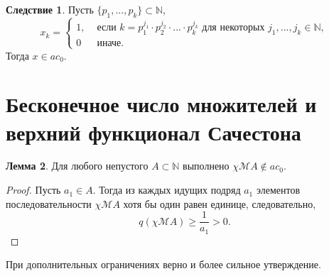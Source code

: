 \documentclass[a4paper,openbib]{article}
\theoremstyle{definition}
\newtheorem{lemma}{Лемма}[section]
\newtheorem{corollary}[lemma]{Следствие}
\begin{document}
\begin{corollary}
	\label{cor:ac0_powers_finite_set_of_numbers}
	Пусть $\{p_1, ..., p_k\} \subset \mathbb{N}$,
	\begin{equation}
		x_k = \begin{cases}
			1, &\mbox{~если~} k = p_1^{j_1}\cdot p_2^{j_2}\cdot ... \cdot p_k^{j_k} \mbox{~для некоторых~} j_1,...,j_k\in\mathbb{N},
			\\
			0  &\mbox{~иначе}.
		\end{cases}
	\end{equation}
	Тогда $x\in ac_0$.
\end{corollary}




\section{Бесконечное число множителей и \\  верхний функционал Сачестона}




\begin{lemma}
	Для любого непустого $A\subset \mathbb{N} $ выполнено $\chi\mathscr{M}A \notin ac_0$.
\end{lemma}
\begin{proof}
	Пусть $a_1\in A$.
	Тогда из каждых идущих подряд $a_1$ элементов последовательности $\chi\mathscr{M}A$
	хотя бы один равен единице,
	следовательно,
	\begin{equation}
		q(\chi\mathscr{M}A) \geq \frac{1}{a_1} > 0
		.
	\end{equation}
\end{proof}

При дополнительных ограничениях верно и более сильное утверждение.
\end{document}
